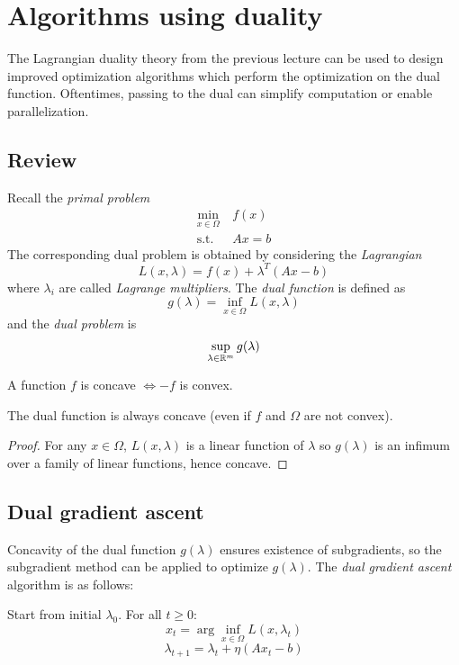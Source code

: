 \section{Algorithms using duality}

The Lagrangian duality theory from the previous lecture can be used to
design improved optimization algorithms which perform the optimization
on the dual function. Oftentimes, passing to the dual can simplify
computation or enable parallelization.

\subsection{Review}

Recall the \emph{primal problem}
\begin{align*}
\min_{x \in \Omega}~&f(x) \\
\text{s.t.}~& A x = b
\end{align*}
The corresponding dual problem is obtained by considering the
\emph{Lagrangian}
\[
L(x,\lambda) = f(x) + \lambda^T(A x  - b)
\]
where $\lambda_i$ are called \emph{Lagrange multipliers}. The
\emph{dual function} is defined as
\[
g(\lambda) = \inf_{x \in \Omega} L(x,\lambda)
\]
and the \emph{dual problem} is
\[
\sup_{\lambda \in \mathbb{R}^m} g(\lambda)
\]

\begin{definition}
A function $f$ is concave $\iff -f$ is convex.
\end{definition}

\begin{fact}
The dual function is always concave (even if $f$ and
$\Omega$ are not convex).
\end{fact}

\begin{proof}
For any $x \in \Omega$,
$L(x,\lambda)$ is a linear function of $\lambda$ so $g(\lambda)$
is an infimum over a family of linear functions, hence concave.
\end{proof}

\subsection{Dual gradient ascent}

Concavity of the dual function $g(\lambda)$ ensures existence of
subgradients, so the subgradient method can be applied to optimize $g(\lambda)$.
The \emph{dual gradient ascent} algorithm is as follows:

Start from initial $\lambda_0$.
For all $t \geq 0$:
\[
x_t = \arg\inf_{x \in \Omega} L(x, \lambda_t)
\]
\[
\lambda_{t+1} = \lambda_t + \eta (A x_t - b)
\]

